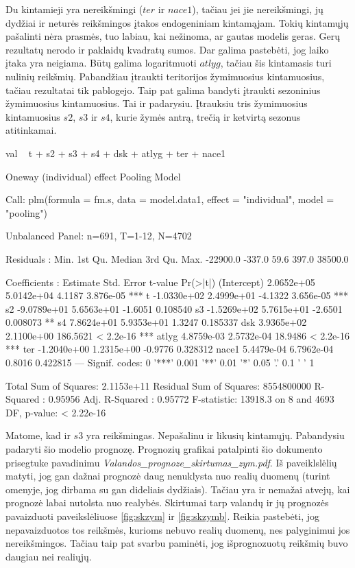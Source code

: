 \documentclass[a4paper]{article}
\begin{document}
Du kintamieji yra nereikšmingi ($ter$ ir $nace1$), tačiau
jei jie nereikšmingi, jų dydžiai ir neturės reikšmingos įtakos
endogeniniam kintamąjam. Tokių kintamųjų pašalinti nėra prasmės, tuo
labiau, kai nežinoma, ar gautas modelis geras. Gerų rezultatų nerodo
ir paklaidų kvadratų sumos. Dar galima pastebėti, jog laiko įtaka yra
neigiama. Būtų galima logaritmuoti $atlyg$, tačiau šis kintamasis
turi nulinių reikšmių. Pabandžiau įtraukti teritorijos žymimuosius
kintamuosius, tačiau rezultatai tik pablogejo. Taip pat galima bandyti įtraukti sezoninius
žymimuosius kintamuosius. Tai ir padarysiu. Įtrauksiu tris žymimuosius
kintamuosius $s2$, $s3$ ir $s4$, kurie žymės antrą, trečią ir ketvirtą
sezonus atitinkamai.
\begin{Schunk}
\begin{Soutput}
val ~ t + s2 + s3 + s4 + dsk + atlyg + ter + nace1
\end{Soutput}
\end{Schunk}
\begin{Schunk}
\begin{Soutput}
Oneway (individual) effect Pooling Model

Call:
plm(formula = fm.s, data = model.data1, effect = "individual", 
    model = "pooling")

Unbalanced Panel: n=691, T=1-12, N=4702

Residuals :
    Min.  1st Qu.   Median  3rd Qu.     Max. 
-22900.0   -337.0     59.6    397.0  38500.0 

Coefficients :
               Estimate  Std. Error  t-value  Pr(>|t|)    
(Intercept)  2.0652e+05  5.0142e+04   4.1187 3.876e-05 ***
t           -1.0330e+02  2.4999e+01  -4.1322 3.656e-05 ***
s2          -9.0789e+01  5.6563e+01  -1.6051  0.108540    
s3          -1.5269e+02  5.7615e+01  -2.6501  0.008073 ** 
s4           7.8624e+01  5.9353e+01   1.3247  0.185337    
dsk          3.9365e+02  2.1100e+00 186.5621 < 2.2e-16 ***
atlyg        4.8759e-03  2.5732e-04  18.9486 < 2.2e-16 ***
ter         -1.2040e+00  1.2315e+00  -0.9776  0.328312    
nace1        5.4479e-04  6.7962e-04   0.8016  0.422815    
---
Signif. codes:  0 '***' 0.001 '**' 0.01 '*' 0.05 '.' 0.1 ' ' 1 

Total Sum of Squares:    2.1153e+11
Residual Sum of Squares: 8554800000
R-Squared      :  0.95956 
      Adj. R-Squared :  0.95772 
F-statistic: 13918.3 on 8 and 4693 DF, p-value: < 2.22e-16
\end{Soutput}
\end{Schunk}

Matome, kad ir $s3$ yra reikšmingas. Nepašalinu ir likusių
kintamųjų. Pabandysiu padaryti šio modelio prognozę. Prognozių
grafikai patalpinti šio dokumento prisegtuke pavadinimu
\emph{Valandos\_prognoze\_skirtumas\_zym.pdf}. Iš paveiklslėlių
matyti, jog gan dažnai prognozė daug nenuklysta nuo realių duomenų
(turint omenyje, jog dirbama su gan dideliais dydžiais). Tačiau yra ir
nemažai atvejų, kai prognozė labai nutolsta nuo realybės. Skirtumai
tarp valandų ir jų prognozės pavaizduoti paveikslėliuose
\ref{fig:skzym} ir \ref{fig:skzymb}. Reikia pastebėti, jog
nepavaizduotos tos reikšmės, kurioms nebuvo realių duomenų, nes
palyginimui jos nereikšmingos. Tačiau taip pat svarbu paminėti, jog
išprognozuotų reikšmių buvo daugiau nei realiųjų.
\end{document}
